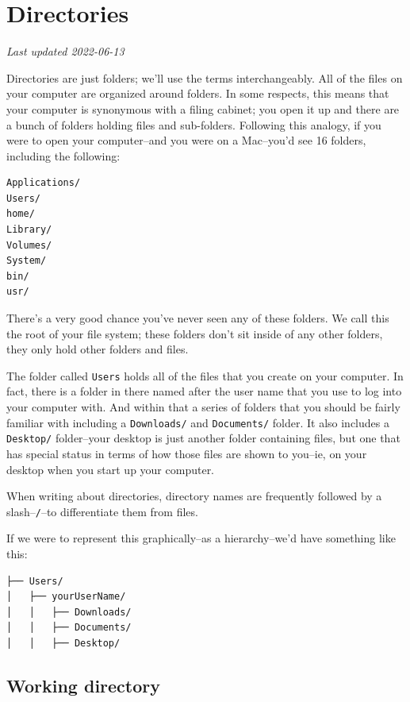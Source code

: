 \documentclass[
]{book}
\begin{document}
\hypertarget{directories}{%
\chapter{Directories}\label{directories}}

\emph{Last updated 2022-06-13}

Directories are just folders; we'll use the terms interchangeably. All of the files on your computer are organized around folders. In some respects, this means that your computer is synonymous with a filing cabinet; you open it up and there are a bunch of folders holding files and sub-folders. Following this analogy, if you were to open your computer--and you were on a Mac--you'd see 16 folders, including the following:

\begin{verbatim}
Applications/
Users/
home/
Library/
Volumes/
System/
bin/
usr/
\end{verbatim}

There's a very good chance you've never seen any of these folders. We call this the root of your file system; these folders don't sit inside of any other folders, they only hold other folders and files.

The folder called \texttt{Users} holds all of the files that you create on your computer. In fact, there is a folder in there named after the user name that you use to log into your computer with. And within that a series of folders that you should be fairly familiar with including a \texttt{Downloads/} and \texttt{Documents/} folder. It also includes a \texttt{Desktop/} folder--your desktop is just another folder containing files, but one that has special status in terms of how those files are shown to you--ie, on your desktop when you start up your computer.

When writing about directories, directory names are frequently followed by a slash--\texttt{/}--to differentiate them from files.

If we were to represent this graphically--as a hierarchy--we'd have something like this:

\begin{verbatim}
├── Users/
│   ├── yourUserName/
│   │   ├── Downloads/
│   │   ├── Documents/
│   │   ├── Desktop/
\end{verbatim}

\hypertarget{working-directory}{%
\section{Working directory}\label{working-directory}}
\end{document}
